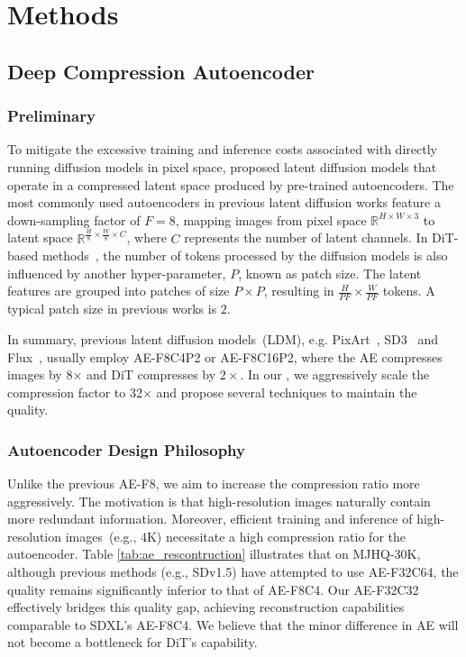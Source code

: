 \section{Methods}

\subsection{Deep Compression Autoencoder} \label{vae}

\subsubsection{Preliminary}
To mitigate the excessive training and inference costs associated with directly running diffusion models in pixel space, \cite{rombach2022high} proposed latent diffusion models that operate in a compressed latent space produced by pre-trained autoencoders. The most commonly used autoencoders in previous latent diffusion works \citep{peebles2023scalable, bao2022all, cai2024condition, esser2024scaling, dai2023emu, chenpixart, chen2024pixart} feature a down-sampling factor of $F=8$, mapping images from pixel space $\mathbb{R}^{H\times W\times 3}$ to latent space $\mathbb{R}^{\frac{H}{8}\times \frac{W}{8}\times C}$, where $C$ represents the number of latent channels.
In DiT-based methods~\citep{peebles2023scalable}, the number of tokens processed by the diffusion models is also influenced by another hyper-parameter, $P$, known as patch size. The latent features are grouped into patches of size $P\times P$, resulting in $\frac{H}{PF}\times \frac{W}{PF}$ tokens. A typical patch size in previous works is $2$.

In summary, previous latent diffusion models~(LDM), e.g. PixArt~\citep{chenpixart}, SD3~\citep{esser2024scaling} and Flux~\citep{FLUX}, usually employ AE-F8C4P2 or AE-F8C16P2, where the AE compresses images by 8$\times$ and DiT compresses by $2\times$. In our \model{}, we aggressively scale the compression factor to 32$\times$ and propose several techniques to maintain the quality.

\subsubsection{Autoencoder Design Philosophy}
Unlike the previous AE-F8, we aim to increase the compression ratio more aggressively. The motivation is that high-resolution images naturally contain more redundant information. Moreover, efficient training and inference of high-resolution images~(e.g., 4K) necessitate a high compression ratio for the autoencoder.
Table \ref{tab:ae_rescontruction} illustrates that on MJHQ-30K, although previous methods (e.g., SDv1.5) have attempted to use AE-F32C64, the quality remains significantly inferior to that of AE-F8C4. Our AE-F32C32 effectively bridges this quality gap, achieving reconstruction capabilities comparable to SDXL's AE-F8C4. We believe that the minor difference in AE will not become a bottleneck for DiT's capability.

